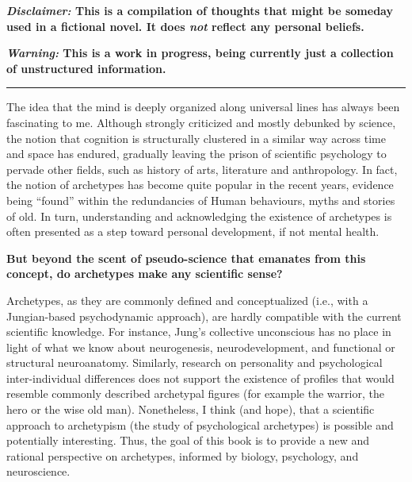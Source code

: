 \documentclass[
]{book}
\begin{document}
\textbf{\emph{Disclaimer:} This is a compilation of thoughts that might be someday used in a fictional novel. It does \emph{not} reflect any personal beliefs.}

\textbf{\emph{Warning:} This is a work in progress, being currently just a collection of unstructured information.}

\begin{center}\rule{0.5\linewidth}{0.5pt}\end{center}

The idea that the mind is deeply organized along universal lines has always been fascinating to me. Although strongly criticized and mostly debunked by science, the notion that cognition is structurally clustered in a similar way across time and space has endured, gradually leaving the prison of scientific psychology to pervade other fields, such as history of arts, literature and anthropology. In fact, the notion of archetypes has become quite popular in the recent years, evidence being ``found'' within the redundancies of Human behaviours, myths and stories of old. In turn, understanding and acknowledging the existence of archetypes is often presented as a step toward personal development, if not mental health.

\textbf{But beyond the scent of pseudo-science that emanates from this concept, do archetypes make any scientific sense?}

Archetypes, as they are commonly defined and conceptualized (i.e., with a Jungian-based psychodynamic approach), are hardly compatible with the current scientific knowledge. For instance, Jung's collective unconscious has no place in light of what we know about neurogenesis, neurodevelopment, and functional or structural neuroanatomy. Similarly, research on personality and psychological inter-individual differences does not support the existence of profiles that would resemble commonly described archetypal figures (for example the warrior, the hero or the wise old man). Nonetheless, I think (and hope), that a scientific approach to archetypism (the study of psychological archetypes) is possible and potentially interesting. Thus, the goal of this book is to provide a new and rational perspective on archetypes, informed by biology, psychology, and neuroscience.
\end{document}
